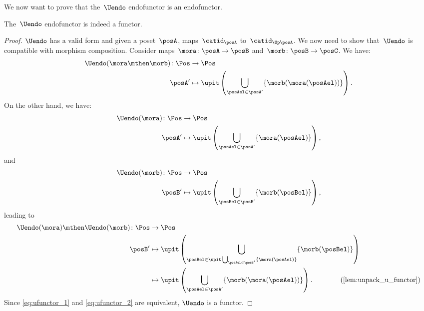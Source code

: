 We now want to prove that the~$\Uendo$ endofunctor is an endofunctor.

\begin{lemma}
    \label{lem:Uendo-is-functor}
    The~$\Uendo$ endofunctor is indeed a functor.
\end{lemma}

\begin{proof}
    $\Uendo$ has a valid form and given a poset~$\posA$, maps~$\catid_\posA$ to~$\catid_{\Up \posA}$.
    We now need to show that~$\Uendo$ is compatible with morphism composition.
    Consider maps~$\mora\colon \posA \to \posB$ and~$\morb\colon \posB \to \posC$.
    We have:
    \begin{equation}
        \label{eq:ufunctor_1}
        \begin{aligned}
            \Uendo(\mora\mthen \morb)\colon \Pos & \to \Pos \\
            \posA'                               & \mapsto \upit \left( \bigcup_{\posAel\in \posA'} \{\morb(\mora(\posAel))\}\right).
        \end{aligned}
    \end{equation}
    On the other hand, we have:
    \begin{equation}
        \begin{aligned}
            \Uendo(\mora)\colon \Pos & \to \Pos \\
            \posA'                   & \mapsto \upit \left( \bigcup_{\posAel\in \posA'}\{\mora(\posAel)\}\right),
        \end{aligned}
    \end{equation}
    and
    \begin{equation}
        \begin{aligned}
            \Uendo(\morb)\colon \Pos & \to \Pos \\
            \posB'                   & \mapsto \upit \left( \bigcup_{\posBel\in \posB'}\{\morb(\posBel)\}\right),
        \end{aligned}
    \end{equation}
    leading to
    \begin{equation}
        \label{eq:ufunctor_2}
        \begin{aligned}
            \Uendo(\mora)\mthen \Uendo(\morb)\colon \Pos & \to \Pos \\
            \posB'                                       & \mapsto \upit\left( \bigcup_{\posBel\in \upit \bigcup_{\posAel\in \posB'}\{\mora(\posAel)\}}\{\morb(\posBel)\}\right) \\
                                                         & \mapsto \upit \left(\bigcup_{\posAel\in \posA'} \{ \morb(\mora(\posAel))\}\right).
            \qquad \qquad (\cref{lem:unpack_u_functor})
        \end{aligned}
    \end{equation}
    Since \cref{eq:ufunctor_1} and \cref{eq:ufunctor_2} are equivalent, $\Uendo$ is a functor.
\end{proof}
